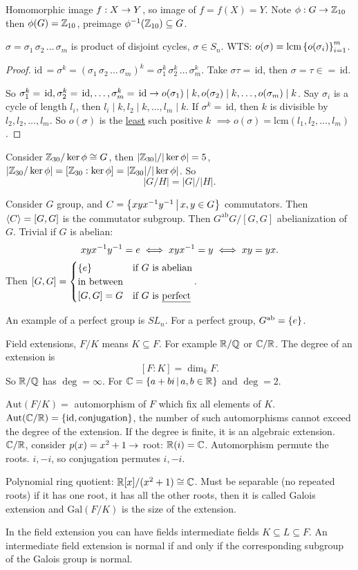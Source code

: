 \documentclass[]{article}
\begin{document}
Homomorphic image $f:X\rightarrow Y$, so image of $f=f(X)=Y$. Note $\phi:G\rightarrow\mathbb{Z}_{10}$ then $\phi(G)=\mathbb{Z}_{10}$, preimage $\phi^{-1}(\mathbb{Z}_{10})\subseteq G$.
\begin{example}
	$\sigma=\sigma_1\,\sigma_2\,\dots\,\sigma_m$ is product of disjoint cycles, $\sigma\in S_n$. 
	WTS: $o(\sigma)=\text{lcm}\left\{ o(\sigma_i) \right\}_{i=1}^m$.
\end{example}
\begin{proof}
	$\text{id}\,=\sigma^k=(\sigma_1\,\sigma_2\,\dots\,\sigma_m)^k=\sigma_1^k\,\sigma_2^k\,\dots\,\sigma_m^k$.
	Take $\sigma\tau=\,\text{id}$, then $\sigma=\tau\in=\,\text{id}$.

	So $\sigma_1^k=\,\text{id},\sigma_2^k=\,\text{id},\dots,\sigma_m^k=\,\text{id}\rightarrow o(\sigma_1)\mid k,o(\sigma_2)\mid k,\dots,o(\sigma_m)\mid k$.
	Say $\sigma_i$ is a cycle of length $l_i$, then $l_i\mid k,l_2\mid k,\dots,l_m\mid k$.
	If $\sigma^k=\,\text{id}$, then $k$ is divisible by $l_2,l_2,\dots,l_m$.
	So $o(\sigma)$ is the \ul{least} such positive $k$ $\implies o(\sigma)=\text{lcm}(l_1,l_2,\dots,l_m)$.
\end{proof}

Consider $\mathbb{Z}_{30}/\ker\phi\cong G$, then $|\mathbb{Z}_{30}|/|\ker\phi|=5$, $|\mathbb{Z}_{30}/\ker\phi| = [\mathbb{Z}_{30}:\ker\phi] = |\mathbb{Z}_{30}|/|\ker\phi|$.
So $$|G/H|=|G|/|H|.$$

Consider $G$ group, and $C=\left\{ xyx^{-1} y^{-1} \, \middle| \, x,y\in G \right\}$ commutators.
Then $\langle C \rangle = [G,G]$ is the commutator subgroup.
Then $G^{\text{ab}}G/[G,G]$ abelianization of $G$.
Trivial if $G$ is abelian: $$xyx^{-1} y^{-1}=e\iff xyx^{-1} = y \iff xy=yx.$$
Then $[G,G]=\begin{cases}\left\{ e \right\} & \text{if }G\text{ is abelian} \\ \text{in between} \\ [G,G]=G & \text{if }G\text{ is \underline{perfect}} \end{cases}$.

An example of a perfect group is $SL_n$.
For a perfect group, $G^{\text{ab}}=\left\{ e \right\}$.

Field extensions, $F/K$ means $K\subseteq F$.
For example $\mathbb{R}/\mathbb{Q}$ or $\mathbb{C}/\mathbb{R}$.
The degree of an extension is $$[F:K]=\dim_k F.$$
So $\mathbb{R}/\mathbb{Q}$ has $\deg=\infty$.
For $\mathbb{C} = \left\{ a+bi \, \middle| \, a,b\in\mathbb{R} \right\}$ and $\deg=2$.

$\text{Aut}(F/K) = $ automorphism of $F$ which fix all elements of $K$.
$\text{Aut}(\mathbb{C}/\mathbb{R})=\left\{ \text{id},\text{conjugation} \right\}$, the number of such automorphisms cannot exceed the degree of the extension.
If the degree is finite, it is an algebraic extension.
$\mathbb{C}/\mathbb{R}$, consider $p(x) = x^2+1 \rightarrow$ root: $\mathbb{R}(i)=\mathbb{C}$.
Automorphism permute the roots.
$i,-i$, so conjugation permutes $i,-i$.

Polynomial ring quotient: $\mathbb{R}[x]/(x^2+1)\cong\mathbb{C}$.
Must be separable (no repeated roots) if it has one root, it has all the other roots, then it is called Galois extension and $\text{Gal}(F/K)$ is the size of the extension.

In the field extension you can have fields intermediate fields $K\subseteq L\subseteq F$.
An intermediate field extension is normal if and only if the corresponding subgroup of the Galois group is normal.
\end{document}
